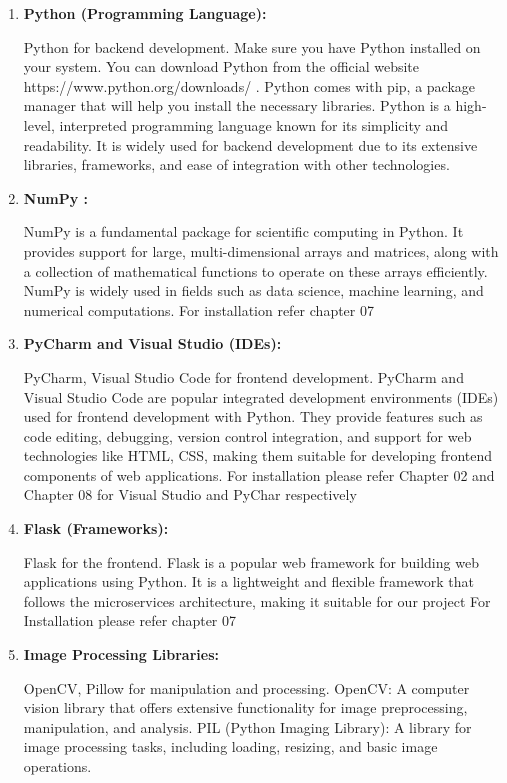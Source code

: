 \begin{enumerate}
	\item \textbf {Python (Programming Language):} 
	
	Python for backend development. Make sure you have Python installed on your system. You can download Python from the official  website                                    https://www.python.org/downloads/ . Python comes with pip, a package manager that will help you install the necessary libraries. Python is a high-level, interpreted programming language known for its simplicity and readability. It is widely used for backend development due to its extensive libraries, frameworks, and ease of integration with other technologies.
	
	\item \textbf {	NumPy :} 
	
	NumPy is a fundamental package for scientific computing in Python. It provides support for large, multi-dimensional arrays and matrices, along with a collection of mathematical functions to operate on these arrays efficiently. NumPy is widely used in fields such as data science, machine learning, and numerical computations. 
	For installation refer chapter 07
	
	\item \textbf {	PyCharm and Visual Studio (IDEs): }
	
	PyCharm, Visual Studio Code for frontend development. PyCharm and Visual Studio Code are popular integrated development environments (IDEs) used for frontend development with Python. They provide features such as code editing, debugging, version control integration, and support for web technologies like HTML, CSS, making them suitable for developing frontend components of web applications.
	For installation please refer Chapter 02 and Chapter 08 for Visual Studio and PyChar respectively
	
	\item \textbf {Flask (Frameworks): }
	
	Flask for the frontend. Flask is a popular web framework for building web applications using Python. It is a lightweight and flexible framework that follows the microservices architecture, making it suitable for our project
	For Installation please refer chapter 07
	
	\item \textbf {Image Processing Libraries:  }
	
	OpenCV, Pillow for manipulation and processing.
	OpenCV: A computer vision library that offers extensive functionality for image preprocessing, manipulation, and analysis.
	PIL (Python Imaging Library): A library for image processing tasks, including loading, resizing, and basic image operations.
	

\end{enumerate}
